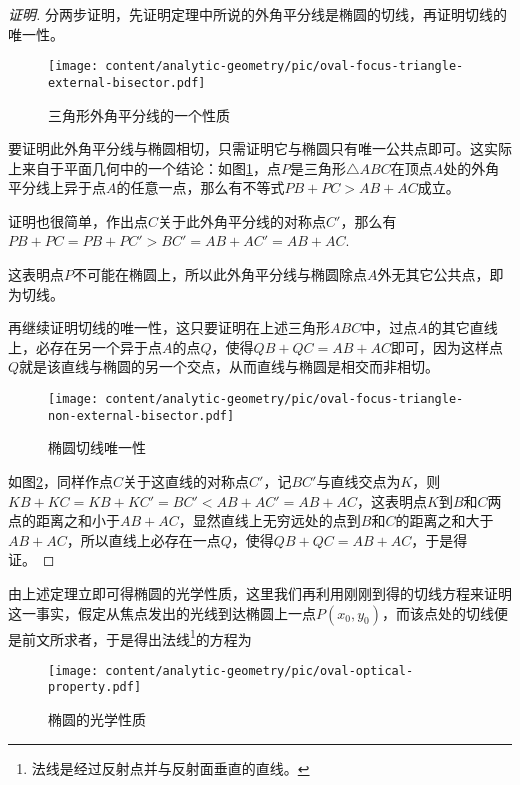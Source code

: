 \begin{proof}[证明]
  分两步证明，先证明定理中所说的外角平分线是椭圆的切线，再证明切线的唯一性。

\begin{figure}[htbp]
  \centering
\texttt{[image: content/analytic-geometry/pic/oval-focus-triangle-external-bisector.pdf]}
\caption{三角形外角平分线的一个性质}
\label{fig:oval-focus-triangle-external-bisector}
\end{figure}

  要证明此外角平分线与椭圆相切，只需证明它与椭圆只有唯一公共点即可。这实际上来自于平面几何中的一个结论：如图\ref{fig:oval-focus-triangle-external-bisector}，点$P$是三角形$\triangle ABC$在顶点$A$处的外角平分线上异于点$A$的任意一点，那么有不等式$PB+PC>AB+AC$成立。

  证明也很简单，作出点$C$关于此外角平分线的对称点$C'$，那么有$PB+PC=PB+PC' > BC' = AB + AC' = AB+AC$.

  这表明点$P$不可能在椭圆上，所以此外角平分线与椭圆除点$A$外无其它公共点，即为切线。

  再继续证明切线的唯一性，这只要证明在上述三角形$ABC$中，过点$A$的其它直线上，必存在另一个异于点$A$的点$Q$，使得$QB+QC=AB+AC$即可，因为这样点$Q$就是该直线与椭圆的另一个交点，从而直线与椭圆是相交而非相切。

\begin{figure}[htbp]
  \centering
\texttt{[image: content/analytic-geometry/pic/oval-focus-triangle-non-external-bisector.pdf]}
\caption{椭圆切线唯一性}
\label{fig:oval-focus-triangle-non-external-bisector}
\end{figure}

  如图\ref{fig:oval-focus-triangle-non-external-bisector}，同样作点$C$关于这直线的对称点$C'$，记$BC'$与直线交点为$K$，则$KB+KC=KB+KC'=BC'<AB+AC'=AB+AC$，这表明点$K$到$B$和$C$两点的距离之和小于$AB+AC$，显然直线上无穷远处的点到$B$和$C$的距离之和大于$AB+AC$，所以直线上必存在一点$Q$，使得$QB+QC=AB+AC$，于是得证。
\end{proof}

由上述定理立即可得椭圆的光学性质，这里我们再利用刚刚到得的切线方程来证明这一事实，假定从焦点发出的光线到达椭圆上一点$P(x_0,y_0)$，而该点处的切线便是前文所求者，于是得出法线\footnote{法线是经过反射点并与反射面垂直的直线。}的方程为

\begin{figure}[htbp]
  \centering
\texttt{[image: content/analytic-geometry/pic/oval-optical-property.pdf]}
\caption{椭圆的光学性质}
\label{fig:oval-optical-property}
\end{figure}

